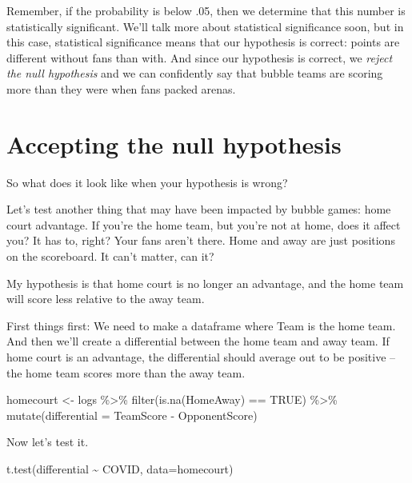 \documentclass[
]{book}
\newenvironment{Shaded}{\begin{snugshade}}{\end{snugshade}}
\newcommand{\AttributeTok}[1]{\textcolor[rgb]{0.77,0.63,0.00}{#1}}
\newcommand{\ConstantTok}[1]{\textcolor[rgb]{0.00,0.00,0.00}{#1}}
\newcommand{\FunctionTok}[1]{\textcolor[rgb]{0.00,0.00,0.00}{#1}}
\newcommand{\NormalTok}[1]{#1}
\newcommand{\OtherTok}[1]{\textcolor[rgb]{0.56,0.35,0.01}{#1}}
\newcommand{\SpecialCharTok}[1]{\textcolor[rgb]{0.00,0.00,0.00}{#1}}
\begin{document}
Remember, if the probability is below .05, then we determine that this number is statistically significant. We'll talk more about statistical significance soon, but in this case, statistical significance means that our hypothesis is correct: points are different without fans than with. And since our hypothesis is correct, we \emph{reject the null hypothesis} and we can confidently say that bubble teams are scoring more than they were when fans packed arenas.

\hypertarget{accepting-the-null-hypothesis}{%
\section{Accepting the null hypothesis}\label{accepting-the-null-hypothesis}}

So what does it look like when your hypothesis is wrong?

Let's test another thing that may have been impacted by bubble games: home court advantage. If you're the home team, but you're not at home, does it affect you? It has to, right? Your fans aren't there. Home and away are just positions on the scoreboard. It can't matter, can it?

My hypothesis is that home court is no longer an advantage, and the home team will score less relative to the away team.

First things first: We need to make a dataframe where Team is the home team. And then we'll create a differential between the home team and away team. If home court is an advantage, the differential should average out to be positive -- the home team scores more than the away team.

\begin{Shaded}
\begin{Highlighting}[]
\NormalTok{homecourt }\OtherTok{\textless{}{-}}\NormalTok{ logs }\SpecialCharTok{\%\textgreater{}\%} \FunctionTok{filter}\NormalTok{(}\FunctionTok{is.na}\NormalTok{(HomeAway) }\SpecialCharTok{==} \ConstantTok{TRUE}\NormalTok{) }\SpecialCharTok{\%\textgreater{}\%} \FunctionTok{mutate}\NormalTok{(}\AttributeTok{differential =}\NormalTok{ TeamScore }\SpecialCharTok{{-}}\NormalTok{ OpponentScore)}
\end{Highlighting}
\end{Shaded}

Now let's test it.

\begin{Shaded}
\begin{Highlighting}[]
\FunctionTok{t.test}\NormalTok{(differential }\SpecialCharTok{\textasciitilde{}}\NormalTok{ COVID, }\AttributeTok{data=}\NormalTok{homecourt)}
\end{Highlighting}
\end{Shaded}
\end{document}
